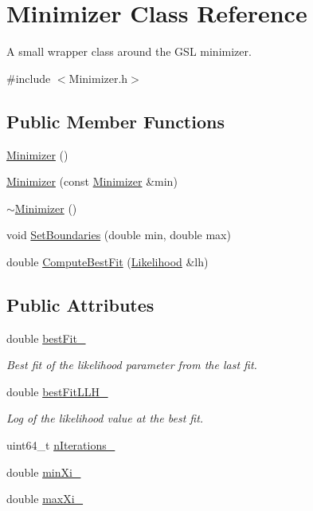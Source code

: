 \hypertarget{classMinimizer}{\section{Minimizer Class Reference}
\label{classMinimizer}
}


A small wrapper class around the G\-S\-L minimizer.  




{\ttfamily \#include $<$Minimizer.\-h$>$}

\subsection*{Public Member Functions}
\begin{DoxyCompactItemize}
\item 
\hyperlink{classMinimizer_a6954aac8325fa56845db3074b4a552d2}{Minimizer} ()
\item 
\hyperlink{classMinimizer_accc9c6d6c3724e4cd057ef4d00b45dfe}{Minimizer} (const \hyperlink{classMinimizer}{Minimizer} \&min)
\item 
\hyperlink{classMinimizer_aa0643eca7cdbc9c8550e3f28e8459ad2}{$\sim$\-Minimizer} ()
\item 
void \hyperlink{classMinimizer_af529621f077cc602c695d1e60e5adbba}{Set\-Boundaries} (double min, double max)
\item 
double \hyperlink{classMinimizer_a4419559871e702cd3da37d45081b1046}{Compute\-Best\-Fit} (\hyperlink{classLikelihood}{Likelihood} \&lh)
\end{DoxyCompactItemize}
\subsection*{Public Attributes}
\begin{DoxyCompactItemize}
\item 
double \hyperlink{classMinimizer_a375d2f66f20fdaedf828a536d473b9b9}{best\-Fit\-\_\-}
\begin{DoxyCompactList}\small\item\em Best fit of the likelihood parameter from the last fit. \end{DoxyCompactList}\item 
double \hyperlink{classMinimizer_ace3797e38fc23cf74bf05a3b1c3cdc36}{best\-Fit\-L\-L\-H\-\_\-}
\begin{DoxyCompactList}\small\item\em Log of the likelihood value at the best fit. \end{DoxyCompactList}\item 
uint64\-\_\-t \hyperlink{classMinimizer_ac2b79419b1d5230732bdf9c3f4ead23e}{n\-Iterations\-\_\-}
\item 
double \hyperlink{classMinimizer_afb5a706ff1374955187d666634f2ac63}{min\-Xi\-\_\-}
\item 
double \hyperlink{classMinimizer_af45f99d12232ed7f056ad16182392752}{max\-Xi\-\_\-}
\end{DoxyCompactItemize}


